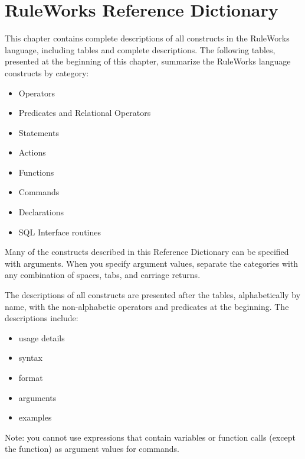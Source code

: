 \chapter{RuleWorks Reference Dictionary}

\makeatletter
\newenvironment{operands}
               {\vspace{1ex}\noindent\textbf{Operands}\nopagebreak
                 \list{}{\labelwidth\z@ \itemindent-\leftmargin
                   \topsep=\z@                   
                   \let\makelabel\operandlabel\let\labelsep=\textwidth}}
               {\endlist}

This chapter contains complete descriptions of all constructs in the
RuleWorks language, including tables and complete descriptions. The
following tables, presented at the beginning of this chapter,
summarize the RuleWorks language constructs by category:

\begin{itemize}
\item Operators
\item Predicates and Relational Operators
\item Statements
\item Actions
\item Functions
\item Commands
\item Declarations
\item SQL Interface routines
\end{itemize}

Many of the constructs described in this Reference Dictionary can be
specified with arguments. When you specify argument values, separate
the categories with any combination of spaces, tabs, and carriage
returns.

The descriptions of all constructs are presented after the tables,
alphabetically by name, with the non-alphabetic operators and
predicates at the beginning. The descriptions include:

\begin{itemize}
\item usage details
\item syntax
\item format
\item arguments
\item examples
\end{itemize}

Note: you cannot use expressions that contain variables or function
calls (except the  function) as argument values for
commands.

